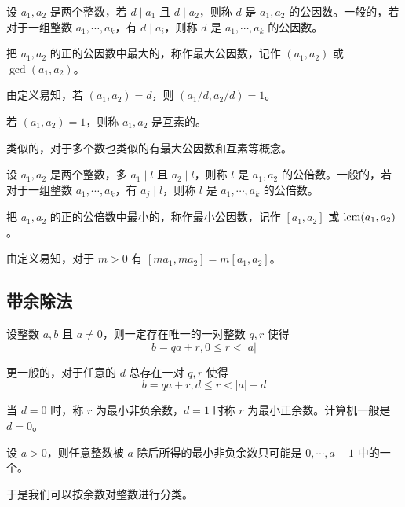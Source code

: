 \begin{definition}[公因数]
    设 $a_1,a_2$ 是两个整数，若 $d \mid a_1 $ 且 $ d \mid a_2$，则称 $d$ 是 $a_1,a_2$ 的公因数。一般的，若对于一组整数 $a_1,\cdots,a_k$，有 $d \mid a_i$，则称 $d$ 是 $a_1,\cdots,a_k$ 的公因数。
\end{definition}

把 $a_1,a_2$ 的正的公因数中最大的，称作最大公因数，记作 $(a_1,a_2)$ 或 $\gcd(a_1,a_2)$。

由定义易知，若 $(a_1,a_2) = d$，则 $(a_1/d, a_2/d) = 1$。

\begin{definition}[互素]
    若 $(a_1,a_2) = 1$，则称 $a_1,a_2$ 是互素的。
\end{definition}

类似的，对于多个数也类似的有最大公因数和互素等概念。

\begin{definition}[公倍数]
    设 $a_1,a_2$ 是两个整数，多 $a_1 \mid l$ 且 $a_2 \mid l$，则称 $l$ 是 $a_1,a_2$ 的公倍数。一般的，若对于一组整数 $a_1,\cdots,a_k$，有 $a_j \mid l$，则称 $l$ 是 $a_1,\cdots,a_k$ 的公倍数。
\end{definition}

把 $a_1,a_2$ 的正的公倍数中最小的，称作最小公因数，记作 $[a_1,a_2]$ 或 $\operatorname{lcm}(a_1,a_2)$。

由定义易知，对于 $m > 0$ 有 $[ma_1,ma_2] = m[a_1,a_2]$。

\subsection{带余除法}

\begin{theorem}
    设整数 $a,b$ 且 $a \ne 0$，则一定存在唯一的一对整数 $q,r$ 使得
    \[ b = qa + r, 0 \leqslant r < |a| \]
\end{theorem}

更一般的，对于任意的 $d$ 总存在一对 $q,r$ 使得
\[ b = qa + r, d \leqslant r < |a| + d \]

当 $d = 0$ 时，称 $r$ 为最小非负余数，$d = 1$ 时称 $r$ 为最小正余数。计算机一般是 $d = 0$。

\begin{lemma}
    设 $a > 0$，则任意整数被 $a$ 除后所得的最小非负余数只可能是 $0,\cdots,a-1$ 中的一个。 
\end{lemma}

于是我们可以按余数对整数进行分类。